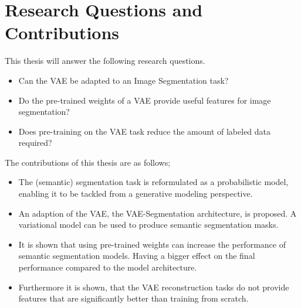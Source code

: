 \section{Research Questions and Contributions}
This thesis will answer the following research questions.
\begin{itemize}
    \item Can the VAE be adapted to an Image Segmentation task?
    \item Do the pre-trained weights of a VAE provide useful features for image segmentation?
    \item Does pre-training on the VAE task reduce the amount of labeled data required?
\end{itemize}
The contributions of this thesis are as follows;
\begin{itemize}
    \item The (semantic) segmentation task is reformulated as a probabilistic model, enabling it to be tackled from a generative modeling perspective.
    \item An adaption of the VAE, the VAE-Segmentation architecture, is proposed. A variational model can be used to produce semantic segmentation masks.
    \item It is shown that using pre-trained weights can increase the performance of semantic segmentation models. Having a bigger effect on the final performance compared to the model architecture.
    \item  Furthermore it is shown, that the VAE reconstruction tasks do not provide features that are significantly better than training from scratch.
\end{itemize}
